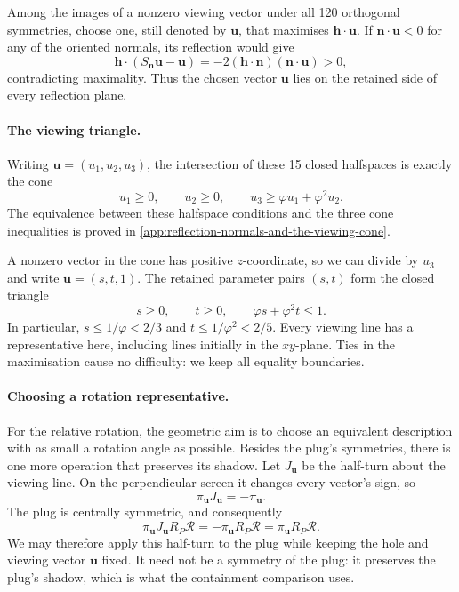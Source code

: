 Among the images of a nonzero viewing vector under all 120 orthogonal symmetries,
choose one, still denoted by $\mathbf u$, that maximises
$\mathbf h\cdot\mathbf u$. If $\mathbf n\cdot\mathbf u<0$ for any of the
oriented normals, its reflection would give
\[
  \mathbf h\cdot(S_{\mathbf n}\mathbf u-\mathbf u)
    =-2(\mathbf h\cdot\mathbf n)(\mathbf n\cdot\mathbf u)>0,
\]
contradicting maximality. Thus the chosen vector $\mathbf u$ lies on the retained side
of every reflection plane.

\paragraph{The viewing triangle.}
Writing $\mathbf u=(u_1,u_2,u_3)$, the intersection of these 15 closed
halfspaces is exactly the cone
\begin{equation}\label{eq:viewing-cone}
  u_1\ge0,\qquad u_2\ge0,\qquad
  u_3\ge\varphi u_1+\varphi^2u_2.
\end{equation}
The equivalence between these halfspace conditions and the three cone
inequalities is proved in \cref{app:reflection-normals-and-the-viewing-cone}.

A nonzero vector in the cone has positive $z$-coordinate, so we can divide
by $u_3$ and write $\mathbf u=(s,t,1)$. The retained parameter pairs $(s,t)$
form the closed triangle
\begin{equation}\label{eq:viewing-triangle}
  s\ge0,\qquad t\ge0,\qquad \varphi s+\varphi^2t\le1.
\end{equation}
In particular, $s\le1/\varphi<2/3$ and $t\le1/\varphi^2<2/5$.
Every viewing line has a representative here, including lines initially
in the $xy$-plane. Ties in the maximisation cause no difficulty: we keep
all equality boundaries.

\paragraph{Choosing a rotation representative.}
For the relative rotation, the geometric aim is to choose an equivalent
description with as small a rotation angle as possible. Besides the plug's
symmetries, there is one more operation that preserves its shadow.
Let $J_{\mathbf u}$ be the half-turn about the viewing line. On the
perpendicular screen it changes every vector's sign, so
\[
  \pi_{\mathbf u}J_{\mathbf u}=-\pi_{\mathbf u}.
\]
The plug is centrally symmetric, and consequently
\begin{equation}\label{eq:projected-half-turn}
  \pi_{\mathbf u}J_{\mathbf u}R_{P}\mathcal R
    =-\pi_{\mathbf u}R_{P}\mathcal R
    =\pi_{\mathbf u}R_{P}\mathcal R.
\end{equation}
We may therefore apply this half-turn to the plug while keeping the hole
and viewing vector $\mathbf u$ fixed. It need not be a symmetry of the plug: it preserves the plug's
shadow, which is what the containment comparison uses.


